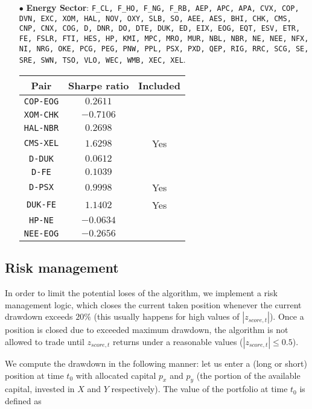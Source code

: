 \documentclass{paper}
\begin{document}
\begin{itemize}
\item[$\bullet$] \textbf{Energy Sector}: \texttt{F\_CL, F\_HO, F\_NG, F\_RB, AEP, APC, APA, CVX, COP, DVN, EXC, XOM, HAL, NOV, OXY, SLB, SO, AEE, AES, BHI, CHK, CMS, CNP, CNX, COG, D, DNR, DO, DTE, DUK, ED, EIX, EOG, EQT, ESV, ETR, FE, FSLR, FTI, HES, HP, KMI, MPC, MRO, MUR, NBL, NBR, NE, NEE, NFX, NI, NRG, OKE, PCG, PEG, PNW, PPL, PSX, PXD, QEP, RIG, RRC, SCG, SE, SRE, SWN, TSO, VLO, WEC, WMB, XEC, XEL}.
\begin{center}
\begin{tabular}{| c | c | c | }
\hline
\textbf{Pair} & \textbf{Sharpe ratio}  & \textbf{Included} \\ \hline
\texttt{COP-EOG} & $0.2611$ &   \\ \hline
\texttt{XOM-CHK} & $-0.7106$ &   \\ \hline
\texttt{HAL-NBR} & $0.2698$ &    \\ \hline
\texttt{CMS-XEL} & $1.6298$ & Yes  \\ \hline
\texttt{D-DUK} & $0.0612$ &   \\ \hline
\texttt{D-FE} & $0.1039$ &   \\ \hline
\texttt{D-PSX} & $0.9998$ & Yes   \\ \hline
\texttt{DUK-FE} & $1.1402$ & Yes   \\ \hline
\texttt{HP-NE} & $-0.0634$ &    \\ \hline
\texttt{NEE-EOG} & $-0.2656$ &    \\ \hline
\end{tabular}
\end{center}

\end{itemize}

\subsection{Risk management}

In order to limit the potential loses of the algorithm, we implement a risk management logic, which closes the current taken position whenever the current drawdown exceeds $20\%$ (this usually happens for high values of $|z_{score,t}|$). Once a position is closed due to exceeded maximum drawdown, the algorithm is not allowed to trade until  $z_{score,t}$ returns under a reasonable values ($|z_{score,t}| \leq 0.5$).

We compute the drawdown in the following manner: let us enter a (long or short) position at time $t_0$ with allocated capital $p_x$ and $p_y$ (the portion of the available capital, invested in $X$ and $Y$ respectively). The value of the portfolio at time $t_0$ is defined as 
\end{document}
